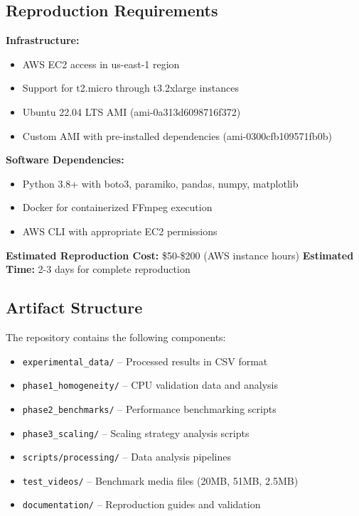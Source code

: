 \documentclass[conference]{IEEEtran}
\begin{document}
\subsection{Reproduction Requirements}

\textbf{Infrastructure:}
\begin{itemize}
	\item AWS EC2 access in us-east-1 region
	\item Support for t2.micro through t3.2xlarge instances
	\item Ubuntu 22.04 LTS AMI (ami-0a313d6098716f372)
	\item Custom AMI with pre-installed dependencies (ami-0300cfb109571fb0b)
\end{itemize}

\textbf{Software Dependencies:}
\begin{itemize}
	\item Python 3.8+ with boto3, paramiko, pandas, numpy, matplotlib
	\item Docker for containerized FFmpeg execution
	\item AWS CLI with appropriate EC2 permissions
\end{itemize}

\textbf{Estimated Reproduction Cost:} \$50-\$200 (AWS instance hours)
\textbf{Estimated Time:} 2-3 days for complete reproduction


\subsection{Artifact Structure}

The repository contains the following components:

\begin{itemize}
	\item \texttt{experimental\_data/} -- Processed results in CSV format
	\item \texttt{phase1\_homogeneity/} -- CPU validation data and analysis  
	\item \texttt{phase2\_benchmarks/} -- Performance benchmarking scripts
	\item \texttt{phase3\_scaling/} -- Scaling strategy analysis scripts
	\item \texttt{scripts/processing/} -- Data analysis pipelines
	\item \texttt{test\_videos/} -- Benchmark media files (20MB, 51MB, 2.5MB)
	\item \texttt{documentation/} -- Reproduction guides and validation
\end{itemize}
\end{document}
